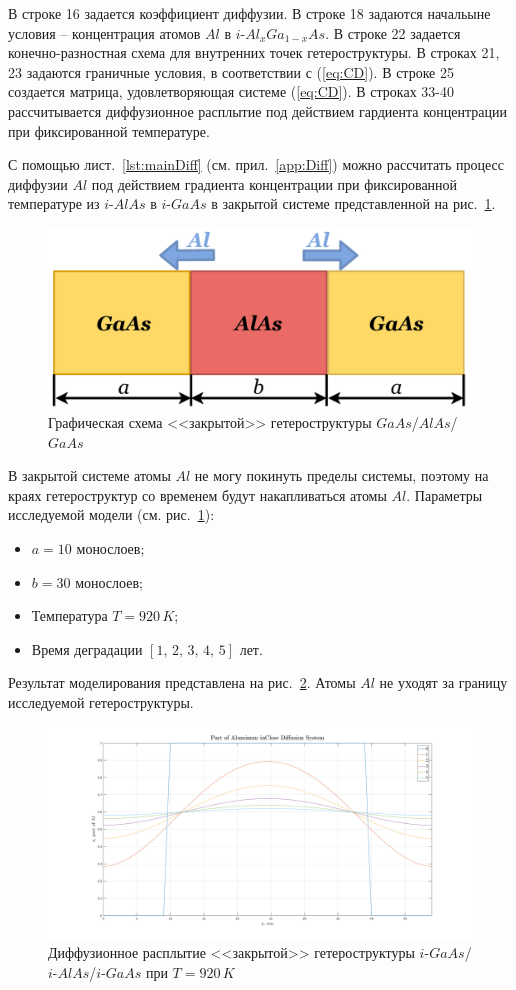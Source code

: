 В строке 16 задается коэффициент диффузии. В строке 18 задаются начальыне условия -- концентрация атомов $Al$ в $i$-$Al_{x}Ga_{1-x}As$. В строке 22 задается конечно-разностная схема для внутренних точек гетероструктуры. В строках 21, 23 задаются граничные условия, в соответствии с (\ref{eq:CD}). В строке 25 создается матрица, удовлетворяющая системе (\ref{eq:CD}). В строках 33-40 рассчитывается диффузионное расплытие под действием гардиента концентрации при фиксированной температуре.

С помощью лист.~\ref{lst:mainDiff} (см. прил.~\ref{app:Diff}) можно рассчитать процесс диффузии $Al$ под действием градиента концентрации при фиксированной температуре из $i$-$AlAs$ в $i$-$GaAs$ в закрытой системе представленной на рис.~\ref{fig:DCloseBox}.
\begin{figure}[h!]
	\centering
	\includegraphics[width=0.9\linewidth]{assets/DCloseBox}
	\caption{Графическая схема <<закрытой>> гетероструктуры $GaAs$/$AlAs$/$GaAs$}
	\label{fig:DCloseBox}
\end{figure}

В закрытой системе атомы $Al$ не могу покинуть пределы системы, поэтому на краях гетероструктур со временем будут накапливаться атомы $Al$. Параметры исследуемой модели (см. рис.~\ref{fig:DCloseBox}):
\begin{itemize}
	\item $a = 10$ монослоев;
	\item $b = 30$ монослоев;
	\item Температура $T = 920\,K$;
	\item Время деградации $[1,\,2,\,3,\,4,\,5]$ лет.
\end{itemize}
Результат моделирования представлена на рис.~\ref{fig:DCAl}. Атомы $Al$ не уходят за границу исследуемой гетероструктуры.

\begin{figure}[h!]
	\centering
	\includegraphics[width=0.9\linewidth]{assets/DCAl}
	\caption{Диффузионное расплытие <<закрытой>> гетероструктуры $i$-$GaAs$/$i$-$AlAs$/$i$-$GaAs$ при $T = 920\,K$}
	\label{fig:DCAl}
\end{figure}

